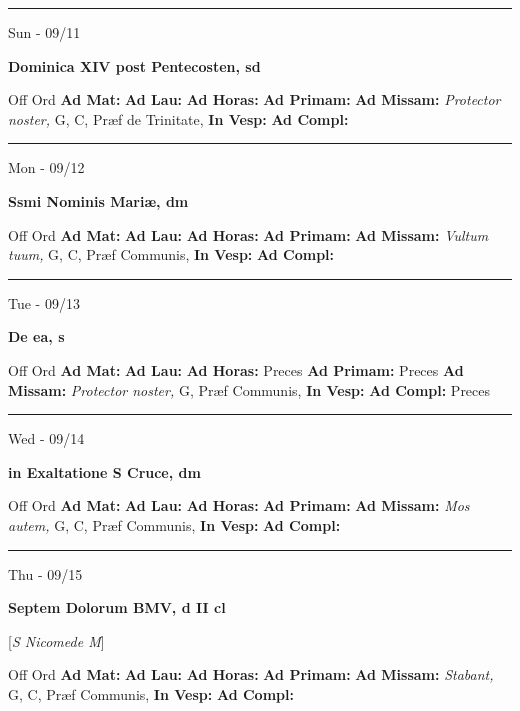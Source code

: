 \documentclass[letterpaper, 10pt]{article}
\begin{document}
\hrule
\begin{center}
Sun - 09/11
\end{center}\textbf{ \large Dominica XIV post Pentecosten, \textnormal{\normalsize sd}}
\begin{justify}
Off Ord
\textbf{Ad Mat: }
\textbf{Ad Lau: }
\textbf{Ad Horas: }
\textbf{Ad Primam: }
\textbf{Ad Missam:} \textit{Protector noster, } G, C, Præf de Trinitate, 
\textbf{In Vesp: }
\textbf{Ad Compl: }\end{justify}



\hrule
\begin{center}
Mon - 09/12
\end{center}\textbf{ \large Ssmi Nominis Mariæ, \textnormal{\normalsize dm}}
\begin{justify}
Off Ord
\textbf{Ad Mat: }
\textbf{Ad Lau: }
\textbf{Ad Horas: }
\textbf{Ad Primam: }
\textbf{Ad Missam:} \textit{Vultum tuum, } G, C, Præf Communis, 
\textbf{In Vesp: }
\textbf{Ad Compl: }\end{justify}



\hrule
\begin{center}
Tue - 09/13
\end{center}\textbf{ \large De ea, \textnormal{\normalsize s}}
\begin{justify}
Off Ord
\textbf{Ad Mat: }
\textbf{Ad Lau: }
\textbf{Ad Horas: }Preces
\textbf{Ad Primam: }Preces
\textbf{Ad Missam:} \textit{Protector noster, } G, Præf Communis, 
\textbf{In Vesp: }
\textbf{Ad Compl: }Preces\end{justify}



\hrule
\begin{center}
Wed - 09/14
\end{center}\textbf{ \large in Exaltatione S Cruce, \textnormal{\normalsize dm}}
\begin{justify}
Off Ord
\textbf{Ad Mat: }
\textbf{Ad Lau: }
\textbf{Ad Horas: }
\textbf{Ad Primam: }
\textbf{Ad Missam:} \textit{Mos autem, } G, C, Præf Communis, 
\textbf{In Vesp: }
\textbf{Ad Compl: }\end{justify}



\hrule
\begin{center}
Thu - 09/15
\end{center}\textbf{ \large Septem Dolorum BMV, \textnormal{\normalsize d II cl}}

[\textit{S Nicomede M}]
\begin{justify}
Off Ord
\textbf{Ad Mat: }
\textbf{Ad Lau: }
\textbf{Ad Horas: }
\textbf{Ad Primam: }
\textbf{Ad Missam:} \textit{Stabant, } G, C, Præf Communis, 
\textbf{In Vesp: }
\textbf{Ad Compl: }\end{justify}
\end{document}
